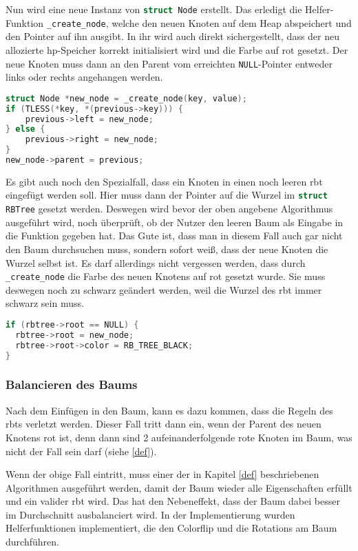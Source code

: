 \documentclass[11pt]{article}
\newcommand{\lstin}[1]{\lstinline[language=C]{#1}}
\begin{document}
Nun wird eine neue Instanz von \lstin{struct Node} erstellt. Das erledigt die Helfer-Funktion \lstin{_create_node}, welche den neuen Knoten auf dem Heap abspeichert und den Pointer auf ihn ausgibt. 
In ihr wird auch direkt sichergestellt, dass der neu allozierte \gls{hp}-Speicher korrekt initialisiert wird und die Farbe auf rot gesetzt.
Der neue Knoten muss dann an den Parent vom erreichten \lstin{NULL}-Pointer entweder links oder rechts angehangen werden.

\begin{lstlisting}[language=C]
struct Node *new_node = _create_node(key, value);
if (TLESS(*key, *(previous->key))) {
    previous->left = new_node;
} else {
    previous->right = new_node;
}
new_node->parent = previous;
\end{lstlisting}

Es gibt auch noch den Spezialfall, dass ein Knoten in einen noch leeren \gls{rbt} eingefügt werden soll. 
Hier muss dann der Pointer auf die Wurzel im \lstin{struct RBTree} gesetzt werden. Deswegen wird bevor der oben angebene Algorithmus ausgeführt wird, noch überprüft, 
ob der Nutzer den leeren Baum als Eingabe in die Funktion gegeben hat. 
Das Gute ist, dass man in diesem Fall auch gar nicht den Baum durchsuchen muss, sondern sofort weiß, dass der neue Knoten die Wurzel selbst ist.
Es darf allerdings nicht vergessen werden, dass durch \lstin{_create_node} die Farbe des neuen Knotens auf rot gesetzt wurde. Sie muss deswegen noch zu schwarz geändert werden, 
weil die Wurzel des \gls{rbt} immer schwarz sein muss. 
\begin{lstlisting}[language=C]
if (rbtree->root == NULL) {
  rbtree->root = new_node;
  rbtree->root->color = RB_TREE_BLACK;
}
\end{lstlisting}

\subsubsection{Balancieren des Baums}
Nach dem Einfügen in den Baum, kann es dazu kommen, dass die Regeln des \glspl{rbt} verletzt werden.
Dieser Fall tritt dann ein, wenn der Parent des neuen Knotens rot ist, denn dann sind 2 aufeinanderfolgende rote Knoten im Baum, was nicht der Fall sein darf (siehe \ref{def}).

Wenn der obige Fall eintritt, muss einer der in Kapitel \ref{def} beschriebenen Algorithmen ausgeführt werden, damit der Baum wieder alle Eigenschaften erfüllt und ein valider \gls{rbt} wird.
Das hat den Nebeneffekt, dass der Baum dabei besser im Durchschnitt ausbalanciert wird. 
In der Implementierung wurden Helferfunktionen implementiert, die den Colorflip und die Rotations am Baum durchführen.
\end{document}
